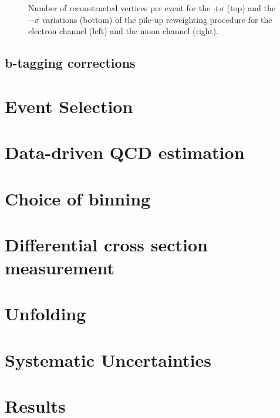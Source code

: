 \begin{figure}[!htpb]
\begin{center}
	\caption{\label{fig:pileup_vertices_variations}
    Number of reconstructed vertices per event for the $+\sigma$ (top) and the $-\sigma$ variations (bottom) of
    the pile-up reweighting procedure for the electron channel (left) and the muon channel (right).}
\end{center}
\end{figure}

\subsection{b-tagging corrections}
\label{ss_xsection:btagging_corrections}

\section{Event Selection}
\label{s_xsection:event_selection}

\section{Data-driven QCD estimation}
\label{s_xsection:data_driven_QCD}

\section{Choice of binning}
\label{s_xsection:binning}

\section{Differential cross section measurement}
\label{s_xsection:measurement}

\section{Unfolding}
\label{s_xsection:unfolding}

\section{Systematic Uncertainties}
\label{s_xsection:systematics}

\section{Results}
\label{s_xsection:results}

